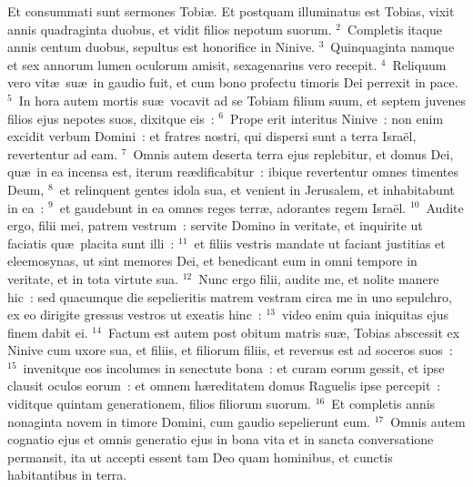 \lettrine[lines=10,image=true,loversize=0.05,lraise=-0.03]{E}{}t consummati sunt sermones Tobi\ae . Et postquam illuminatus est Tobias, vixit annis quadraginta duobus, et vidit filios nepotum suorum.
${}^{2}$~Completis itaque annis centum duobus, sepultus est honorifice in Ninive.
${}^{3}$~Quinquaginta namque et sex annorum lumen oculorum amisit, sexagenarius vero recepit.
${}^{4}$~Reliquum vero vit\ae\ su\ae\ in gaudio fuit, et cum bono profectu timoris Dei perrexit in pace.
${}^{5}$~In hora autem mortis su\ae\ vocavit ad se Tobiam filium suum, et septem juvenes filios ejus nepotes suos, dixitque eis~:
${}^{6}$~Prope erit interitus Ninive~: non enim excidit verbum Domini~: et fratres nostri, qui dispersi sunt a terra Isra\"el, revertentur ad eam.
${}^{7}$~Omnis autem deserta terra ejus replebitur, et domus Dei, qu\ae\ in ea incensa est, iterum re\ae dificabitur~: ibique revertentur omnes timentes Deum,
${}^{8}$~et relinquent gentes idola sua, et venient in Jerusalem, et inhabitabunt in ea~:
${}^{9}$~et gaudebunt in ea omnes reges terr\ae , adorantes regem Isra\"el.
${}^{10}$~Audite ergo, filii mei, patrem vestrum~: servite Domino in veritate, et inquirite ut faciatis qu\ae\ placita sunt illi~:
${}^{11}$~et filiis vestris mandate ut faciant justitias et eleemosynas, ut sint memores Dei, et benedicant eum in omni tempore in veritate, et in tota virtute sua.
${}^{12}$~Nunc ergo filii, audite me, et nolite manere hic~: sed quacumque die sepelieritis matrem vestram circa me in uno sepulchro, ex eo dirigite gressus vestros ut exeatis hinc~:
${}^{13}$~video enim quia iniquitas ejus finem dabit ei.
${}^{14}$~Factum est autem post obitum matris su\ae , Tobias abscessit ex Ninive cum uxore sua, et filiis, et filiorum filiis, et reversus est ad soceros suos~:
${}^{15}$~invenitque eos incolumes in senectute bona~: et curam eorum gessit, et ipse clausit oculos eorum~: et omnem h\ae reditatem domus Raguelis ipse percepit~: viditque quintam generationem, filios filiorum suorum.
${}^{16}$~Et completis annis nonaginta novem in timore Domini, cum gaudio sepelierunt eum.
${}^{17}$~Omnis autem cognatio ejus et omnis generatio ejus in bona vita et in sancta conversatione permansit, ita ut accepti essent tam Deo quam hominibus, et cunctis habitantibus in terra.
